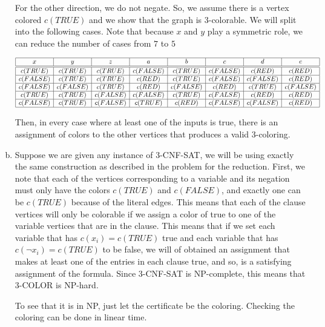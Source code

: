 \documentclass{article}
\begin{document}
\begin{enumerate}[a)]
For the other direction, we do not negate. So, we assume there is a vertex colored $c(TRUE)$ and we show that the graph is 3-colorable. We will split into the following cases. Note that because $x$ and $y$ play a symmetric role, we can reduce the number of cases from $7$ to $5$

\[
\begin{array}{|c|c|c|c|c|c|c|c|}
\hline
x&y&z&a&b&c&d&e\\
\hline
\hline
c(TRUE)&c(TRUE)&c(TRUE)&c(FALSE)&c(TRUE)&c(FALSE)&c(RED)&c(RED)\\
\hline
c(FALSE)&c(TRUE)&c(TRUE)&c(RED)&c(TRUE)&c(FALSE)&c(FALSE)&c(RED)\\
\hline
c(FALSE)&c(FALSE)&c(TRUE)&c(RED)&c(FALSE)&c(RED)&c(TRUE)&c(FALSE)\\
\hline
c(TRUE)&c(TRUE)&c(FALSE)&c(FALSE)&c(TRUE)&c(FALSE)&c(RED)&c(RED)\\
\hline
c(FALSE)&c(TRUE)&c(FALSE)&c(TRUE)&c(RED)&c(FALSE)&c(FALSE)&c(RED)\\
\hline
\end{array}
\]

Then, in every case where at least one of the inputs is true, there is an assignment of colors to the other vertices that produces a valid 3-coloring.
\item
Suppose we are given any instance of 3-CNF-SAT, we will be using exactly the same construction as described in the problem for the reduction. First, we note that each of the vertices corresponding to a variable and its negation must only have the colors $c(TRUE)$ and $c(FALSE)$, and exactly one can be $c(TRUE)$ because of the literal edges. This means that each of the clause vertices will only be colorable if we assign a color of true to one of the variable vertices that are in the clause. This means that if we set each variable that has $c(x_i)=c(TRUE)$ true and each variable that has $c(\neg x_i) = c(TRUE)$ to be false, we will of obtained an assignment that makes at least one of the entries in each clause true, and so, is a satisfying assignment of the formula. Since 3-CNF-SAT is NP-complete, this means that 3-COLOR is NP-hard.

To see that it is in NP, just let the certificate be the coloring. Checking the coloring can be done in linear time.
\end{enumerate}
\end{document}
